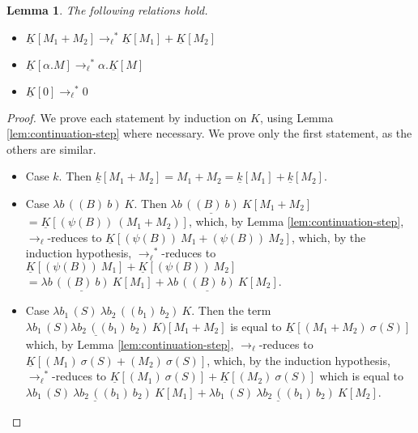 \documentclass{LMCS}
\newtheorem{lemma}[theorem]{Lemma}
\newcommand{\xto}[1]{\ensuremath{\rightarrow_{#1}}}
\newcommand{\tolinred}{\xto{\ell}}
\newcommand{\stolinred}{\ensuremath{\xto{\ell}^{\ast}}}
\begin{document}
\begin{lemma}\label{lem:continuation-linearity}
  The following relations hold.
  \begin{itemize}
    \item $\underline{K}[M_{1}+M_{2}]\stolinred\underline{K}[M_{1}]+\underline{K}[M_{2}]$
    \item $\underline{K}[\alpha.M]\stolinred\alpha.\underline{K}[M]$
    \item $\underline{K}[0]\stolinred0$
  \end{itemize}
\end{lemma}
\begin{proof}
  We prove each statement by induction on $K$, using Lemma \ref{lem:continuation-step}
  where necessary. We prove only the first statement, as the others
  are similar.
  \begin{itemize}
    \item Case $k$. Then $\underline{k}[M_{1}+M_{2}]=M_{1}+M_{2}=\underline{k}[M_{1}]+\underline{k}[M_{2}]$.
    \item Case $\lambda b\,((B)~b)~K$. Then 
      $\underline{\lambda b\,((B)~b)~K}[M_{1}+M_{2}]$
      $=\underline{K}[(\psi(B))~(M_{1}+M_{2})]$,
      which, by Lemma \ref{lem:continuation-step}, \tolinred-reduces to
      $\underline{K}[(\psi(B))~M_{1}+(\psi(B))~M_{2}]$,
      which, by the induction hypothesis, \stolinred-reduces to
      $\underline{K}[(\psi(B))~M_{1}]+\underline{K}[(\psi(B))~M_{2}]$
      $=\underline{\lambda b\,((B)~b)~K}[M_{1}]+\underline{\lambda b\,((B)~b)~K}[M_{2}]$.

    \item Case $\lambda b_1\,(S)~\lambda b_2\,((b_{1})~b_{2})~K$. Then
      the term
      $\underline{\lambda b_1\,(S)\lambda b_2\,((b_{1})~b_{2})~K)}[M_{1}+M_{2}]$
      is equal to
      $\underline{K}[(M_{1}+M_{2})~\sigma(S)]$
      which, by Lemma \ref{lem:continuation-step}, \tolinred-reduces to
      $\underline{K}[(M_{1})~\sigma(S)+(M_{2})~\sigma(S)]$,
      which, by the induction hypothesis, \stolinred-reduces to
      $\underline{K}[(M_{1})~\sigma(S)]+\underline{K}[(M_{2})~\sigma(S)]$
      which is equal to
      $\underline{\lambda b_1\,(S)~\lambda b_2\,((b_{1})~b_{2})~K}[M_{1}]+\underline{\lambda b_1\,(S)~\lambda b_2\,((b_{1})~b_{2})~K}[M_{2}]$.
      \qedhere
  \end{itemize}
\end{proof}
\end{document}
